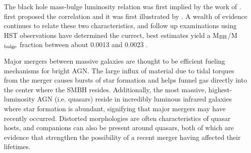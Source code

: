 \documentclass[manuscript]{aastex}
\begin{document}





The black hole mass-bulge luminosity relation was first implied by the work of \cite{Dressler1988}. \cite{Dressler1989} first proposed the correlation and it was first illustrated by \cite{Kormendy1993}. 
A wealth of evidence continues to relate these two characteristics, and follow up examinations using HST observations have determined the currect, best estimates yield a M$_{\rm BH}$/M$_{\rm bulge}$ fraction between about 0.0013 and 0.0023 \citep{Merritt2001a,McLure2001,Marconi2003}. 

Major mergers between massive galaxies are thought to be efficient fueling mechanisms for bright AGN. The large influx of material due to tidal torques from the merger causes bursts of star formation and helps funnel gas directly into the center where the SMBH resides. \citep{Richards2006,Reddy2008,Hopkins2010} Additionally, the most massive, highest-luminosity AGN (i.e. quasars) reside in incredibly luminous infrared galaxies where star formation is abundant, signifying that major mergers may have recently occurred. \citep{Treister2012} Distorted morphologies are often characteristics of quasar hosts, and companions can also be present around quasars, both of which are evidence that strengthen the possibility of a recent merger having affected their lifetimes. 
\end{document}
